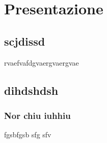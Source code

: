 \section{Presentazione}
	\subsection{scjdissd}
	rvaefvafdgvaergvaergvae

	\subsection{dihdshdsh}
		\subsubsection{Nor chiu iuhhiu}
		fgsbfgsb sfg sfv 



